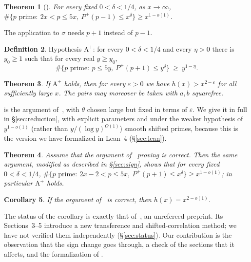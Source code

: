 \documentclass[11pt]{amsart}
\newtheorem{theorem}{Theorem}[section]
\newtheorem{corollary}[theorem]{Corollary}
\theoremstyle{definition}
\newtheorem{definition}[theorem]{Definition}
\theoremstyle{remark}
\newcommand{\eps}{\varepsilon}
\newcommand{\Pplus}{P^{+}}
\begin{document}
\begin{theorem}[{\cite[Theorem 1.2]{WD}}]\label{thm:wd}
For every fixed $0<\delta<1/4$, as $x\to\infty$,
$\#\{p\text{ prime}:\ 2x<p\le5x,\ \Pplus(p-1)\le x^\delta\}\ge x^{1-o(1)}$.
\end{theorem}

The application to $\sigma$ needs $p+1$ instead of $p-1$.

\begin{definition}\label{def:aplus}
Hypothesis $\mathrm{A}^+$: for every $0<\delta<1/4$ and every $\eta>0$ there is $y_0\ge1$ such that for every real $y\ge y_0$,
\[
 \#\{p\text{ prime}:\ p\le 5y,\ \Pplus(p+1)\le y^\delta\}\ \ge\ y^{1-\eta}.
\]
\end{definition}

\begin{theorem}\label{thm:main}
If $\mathrm{A}^+$ holds, then for every $\eps>0$ we have $h(x)>x^{2-\eps}$ for all sufficiently large $x$. The pairs may moreover be taken with $a,b$ squarefree.
\end{theorem}

 is the argument of~\cite[\S6]{PP16}, with $\theta$ chosen large but fixed in terms of $\eps$. We give it in full in \S\ref{sec:reduction}, with explicit parameters and under the weaker hypothesis of $y^{1-o(1)}$ (rather than $y/(\log y)^{O(1)}$) smooth shifted primes, because this is the version we have formalized in Lean~4 (\S\ref{sec:lean}).

\begin{theorem}\label{thm:aplus}
Assume that the argument of~\cite{WD} proving  is correct. Then the same argument, modified as described in \S\ref{sec:sign}, shows that for every fixed $0<\delta<1/4$, $\#\{p\text{ prime}:\ 2x-2<p\le5x,\ \Pplus(p+1)\le x^\delta\}\ge x^{1-o(1)}$; in particular $\mathrm{A}^+$ holds.
\end{theorem}

\begin{corollary}
If the argument of~\cite{WD} is correct, then $h(x)=x^{2-o(1)}$.
\end{corollary}

The status of the corollary is exactly that of~\cite{WD}, an unrefereed preprint. Its Sections~3--5 introduce a new transference and shifted-correlation method; we have not verified them independently (\S\ref{sec:status}). Our contribution is the observation that the sign change goes through, a check of the sections that it affects, and the formalization of .
\end{document}
